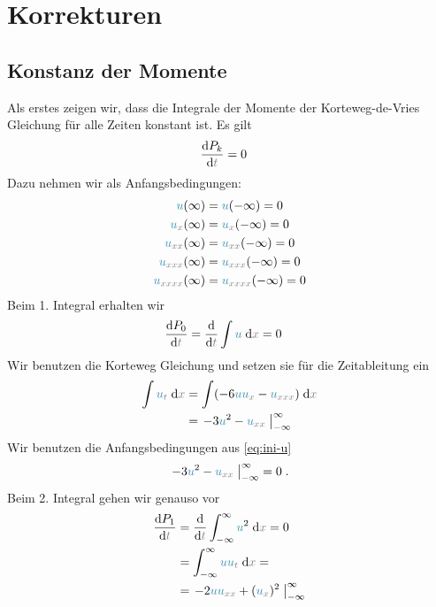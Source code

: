 \documentclass[10pt,fleqn,%
reqno,a4paper]{article}
\makeatletter
\def\mathcolor#1#{\@mathcolor{#1}}
\def\@mathcolor#1#2#3{%
        \protect\leavevmode
        \begingroup\color#1{#2}#3\endgroup
}
\newcommand{\nx}{\mathcolor{gray}{x}}
\newcommand{\nt}{\mathcolor{gray}{t}}
\newcommand{\nnu}{\mathcolor{cyan!70!black}{u}}
\newcommand{\ncosh}{\mathcolor{blue!70!black}{\cosh}}
\newcommand{\dif}{\mathrm{d}}
\makeatother
\begin{document}
\section{Korrekturen}
\subsection{Konstanz der Momente}
Als erstes zeigen wir, dass die Integrale der Momente der Korteweg-de-Vries Gleichung für alle Zeiten konstant ist. Es gilt
\begin{align*}
\frac{\dif P_k}{\dif\nt} & = 0
\end{align*}
Dazu nehmen wir als Anfangsbedingungen:
\begin{align}
        \nnu(\infty) &= \nnu (-\infty) = 0\nonumber \\
        \nnu_{ \nx}(\infty) &= \nnu_{ \nx} (-\infty) = 0\nonumber \\
        \nnu_{\nx \nx}(\infty) &= \nnu_{\nx \nx} (-\infty) = 0\nonumber \\
        \nnu_{\nx \nx \nx}(\infty) &= \nnu_{\nx \nx \nx} (-\infty) = 0\nonumber \\
        \nnu_{\nx \nx \nx \nx}(\infty) &= \nnu_{\nx \nx \nx \nx} (-\infty) = 0 \label{eq:ini-u}
\end{align}
Beim 1. Integral erhalten wir
\begin{align*}
\frac{\dif P_0}{\dif\nt} &= \frac{\dif }{\dif\nt}\int \nnu\; \mathrm{d}\nx = 0
\end{align*}
Wir benutzen die Korteweg Gleichung und setzen sie für die Zeitableitung ein
\begin{align*}
        \int \nnu _{\nt} \; \mathrm{d}\nx& = \int (-6\nnu \nnu _{\nx} -\nnu _{\nx \nx \nx}) \; \mathrm{d}\nx\\
        & = \left.-3\nnu ^2 -\nnu _{\nx \nx}\; \right|_{-\infty}^{\infty} %
\end{align*}
Wir benutzen die Anfangsbedingungen aus \ref{eq:ini-u}  
\begin{align*}
        \left.-3\nnu ^2 -\nnu _{\nx \nx}\; \right|_{-\infty}^{\infty} = 0\;.
\end{align*}
Beim 2. Integral gehen wir genauso vor
\begin{align*}
        \frac{\dif P_1}{\dif\nt} &=\frac{\dif }{\dif\nt} \int_{-\infty}^{\infty} \nnu^2\; \mathrm{d}\nx = 0 \\
        & = \int_{-\infty}^{\infty} \nnu \nnu _{\nt} \; \mathrm{d}\nx= \\
        &=\left.-2\nnu\nnu _{\nx \nx}  +(\nnu _{\nx })^2\; \right|_{-\infty}^{\infty}%
\end{align*}
\end{document}

